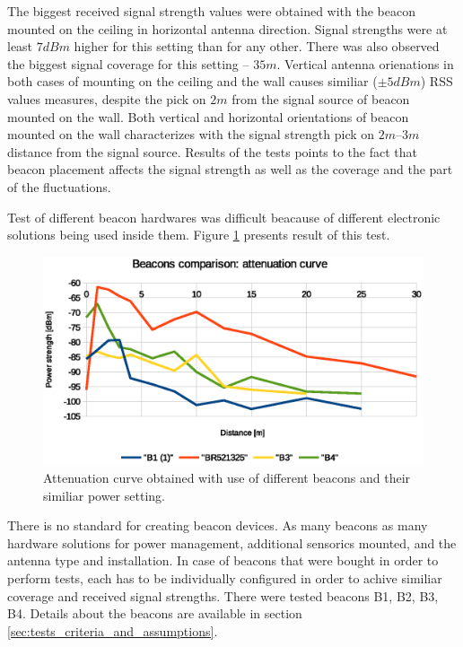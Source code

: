 \documentclass[../main.tex]{subfiles}
\begin{document}
The biggest received signal strength values were obtained with the beacon mounted on the ceiling in horizontal antenna direction. Signal strengths were at least $7dBm$ higher for this setting than for any other. There was also observed the biggest signal coverage for this setting -- $35m$. Vertical antenna orienations in both cases of mounting on the ceiling and the wall causes similiar ($\pm5dBm$) RSS values measures, despite the pick on $2m$ from the signal source of beacon mounted on the wall. Both vertical and horizontal orientations of beacon mounted on the wall characterizes with the signal strength pick on $2m$--$3m$ distance from the signal source. Results of the tests points to the fact that beacon placement affects the signal strength as well as the coverage and the part of the fluctuations.

Test of different beacon hardwares was difficult beacause of different electronic solutions being used inside them. Figure \ref{fig:tests_case8_beacons_comparison} presents result of this test.

\begin{figure}[ht]
\includegraphics[width=\textwidth, keepaspectratio]{pictures/tests_case8_beacons_comparison}
\centering
\caption{Attenuation curve obtained with use of different beacons and their similiar power setting.}
\label{fig:tests_case8_beacons_comparison}
\end{figure}

There is no standard for creating beacon devices. As many beacons as many hardware solutions for power management, additional sensorics mounted, and the antenna type and installation. In case of beacons that were bought in order to perform tests, each has to be individually configured in order to achive similiar coverage and received signal strengths. There were tested beacons B1, B2, B3, B4. Details about the beacons are available in section \ref{sec:tests_criteria_and_assumptions}.
\end{document}
